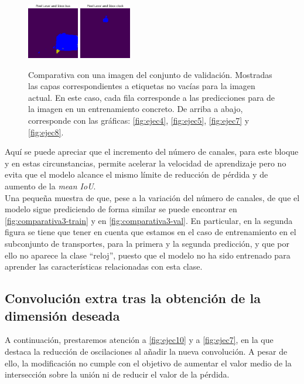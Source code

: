 \begin{figure}[h!]
  \vrule
  \includegraphics[width=0.2\textwidth]{../../modelos-entrenados/unet-nonlocal/ejecucion8/predvalmid6}
  \vrule
  \includegraphics[width=0.2\textwidth]{../../modelos-entrenados/unet-nonlocal/ejecucion8/predvalmid85}
  \caption{Comparativa con una imagen del conjunto de validación. Mostradas las capas correspondientes a etiquetas no vacías para la imagen actual. En este caso, cada fila corresponde a las predicciones para de la imagen en un entrenamiento concreto. De arriba a abajo, corresponde con las gráficas: \autoref{fig:ejec4}, \autoref{fig:ejec5}, \autoref{fig:ejec7} y \autoref{fig:ejec8}.}
  \label{fig:comparativa3-val}
\end{figure}

\newpage
Aquí se puede apreciar que el incremento del número de canales, para este bloque y en estas circunstancias, permite acelerar la velocidad de aprendizaje pero no evita que el modelo alcance el mismo límite de reducción de pérdida y de aumento de la \emph{mean IoU}.\\

\newpage
Una pequeña muestra de que, pese a la variación del número de canales, de que el modelo sigue prediciendo de forma similar se puede encontrar en \autoref{fig:comparativa3-train} y en \autoref{fig:comparativa3-val}. En particular, en la segunda figura se tiene que tener en cuenta que estamos en el caso de entrenamiento en el subconjunto de transportes, para la primera y la segunda predicción, y que por ello no aparece la clase ``reloj'', puesto que el modelo no ha sido entrenado para aprender las características relacionadas con esta clase.
\afterpage{\null\newpage}

\newpage
\subsection{Convolución extra tras la obtención de la dimensión deseada}
A continuación, prestaremos atención a \autoref{fig:ejec10} y a \autoref{fig:ejec7}, en la que destaca la reducción de oscilaciones al añadir la nueva convolución. A pesar de ello, la modificación no cumple con el objetivo de aumentar el valor medio de la intersección sobre la unión ni de reducir el valor de la pérdida.\\

